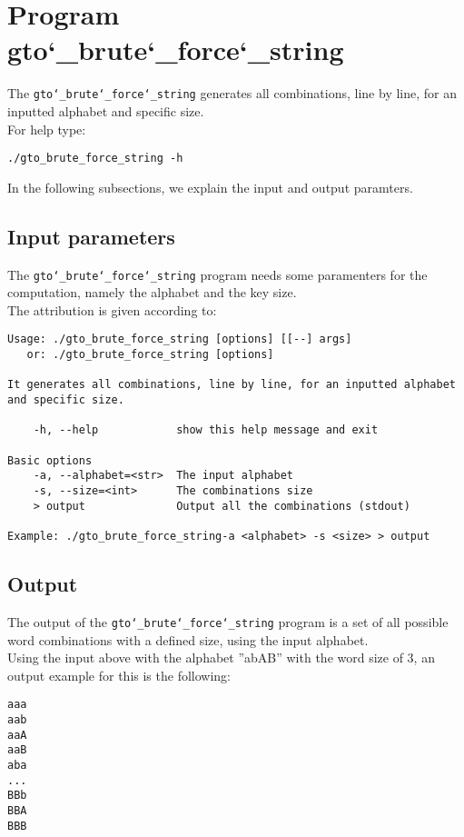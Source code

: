 \section{Program gto\char`_brute\char`_force\char`_string}
The \texttt{gto\char`_brute\char`_force\char`_string} generates all combinations, line by line, for an inputted alphabet and specific size.\\
For help type:
\begin{lstlisting}
./gto_brute_force_string -h
\end{lstlisting}
In the following subsections, we explain the input and output paramters.

\subsection*{Input parameters}

The \texttt{gto\char`_brute\char`_force\char`_string} program needs some paramenters for the computation, namely the alphabet and the key size.\\
The attribution is given according to:
\begin{lstlisting}
Usage: ./gto_brute_force_string [options] [[--] args]
   or: ./gto_brute_force_string [options]

It generates all combinations, line by line, for an inputted alphabet and specific size.

    -h, --help            show this help message and exit

Basic options
    -a, --alphabet=<str>  The input alphabet
    -s, --size=<int>      The combinations size
    > output              Output all the combinations (stdout)

Example: ./gto_brute_force_string-a <alphabet> -s <size> > output
\end{lstlisting}

\subsection*{Output}
The output of the \texttt{gto\char`_brute\char`_force\char`_string} program is a set of all possible word combinations with a defined size, using the input alphabet.\\
Using the input above with the alphabet ''abAB'' with the word size of 3, an output example for this is the following:
\begin{lstlisting}
aaa
aab
aaA
aaB
aba
...
BBb
BBA
BBB
\end{lstlisting}